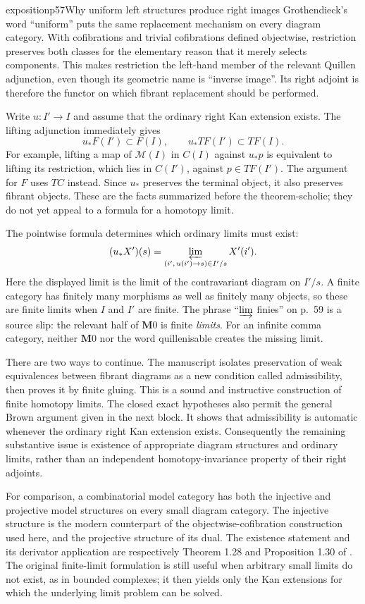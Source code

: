 \begin{dcomment}{exposition}{p57}{Why uniform left structures produce right images}
Grothendieck's word ``uniform'' puts the same replacement mechanism on every diagram category. With cofibrations and trivial cofibrations defined objectwise, restriction preserves both classes for the elementary reason that it merely selects components. This makes restriction the left-hand member of the relevant Quillen adjunction, even though its geometric name is ``inverse image''. Its right adjoint is therefore the functor on which fibrant replacement should be performed.

Write $u:I'\to I$ and assume that the ordinary right Kan extension exists. The lifting adjunction immediately gives
\[
 u_*F(I')\subset F(I),\qquad u_*TF(I')\subset TF(I).
\]
For example, lifting a map of $\mathcal M(I)$ in $C(I)$ against $u_*p$ is equivalent to lifting its restriction, which lies in $C(I')$, against $p\in TF(I')$. The argument for $F$ uses $TC$ instead. Since $u_*$ preserves the terminal object, it also preserves fibrant objects. These are the facts summarized before the theorem-scholie; they do not yet appeal to a formula for a homotopy limit.

The pointwise formula determines which ordinary limits must exist:
\[
 (u_*X')(s)=\varprojlim_{(i',\,u(i')\to s)\in I'/s}X'(i').
\]
Here the displayed limit is the limit of the contravariant diagram on $I'/s$. A finite category has finitely many morphisms as well as finitely many objects, so these are finite limits when $I$ and $I'$ are finite. The phrase ``$\varinjlim$ finies'' on p.~59 is a source slip: the relevant half of $\mathbf M0$ is finite \emph{limits}. For an infinite comma category, neither $\mathbf M0$ nor the word quillenisable creates the missing limit.

There are two ways to continue. The manuscript isolates preservation of weak equivalences between fibrant diagrams as a new condition called admissibility, then proves it by finite gluing. This is a sound and instructive construction of finite homotopy limits. The closed exact hypotheses also permit the general Brown argument given in the next block. It shows that admissibility is automatic whenever the ordinary right Kan extension exists. Consequently the remaining substantive issue is existence of appropriate diagram structures and ordinary limits, rather than an independent homotopy-invariance property of their right adjoints.

For comparison, a combinatorial model category has both the injective and projective model structures on every small diagram category. The injective structure is the modern counterpart of the objectwise-cofibration construction used here, and the projective structure of its dual. The existence statement and its derivator application are respectively Theorem 1.28 and Proposition 1.30 of \citet{Groth2013}. The original finite-limit formulation is still useful when arbitrary small limits do not exist, as in bounded complexes; it then yields only the Kan extensions for which the underlying limit problem can be solved.
\end{dcomment}

